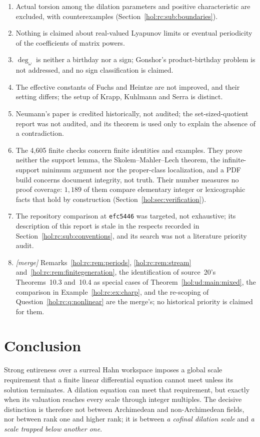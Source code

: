 \documentclass[11pt]{article}
\numberwithin{equation}{section}
\theoremstyle{definition}
\theoremstyle{remark}
\begin{document}
\begin{enumerate}[label=\textup{(V\arabic*)}]
derivation; derivations of the coefficient field are not treated
(Question~\ref{hol:rc:q:derivations}).
\item Actual torsion among the dilation parameters and positive characteristic
are excluded, with counterexamples (Section~\ref{hol:rc:sub:boundaries}).
\item Nothing is claimed about real-valued Lyapunov limits or eventual
periodicity of the coefficients of matrix powers.
\item $\deg_\omega$ is neither a birthday nor a sign; Gonshor's
product-birthday problem is not addressed, and no sign classification is
claimed.
\item The effective constants of Fuchs and Heintze are not improved, and
their setting differs; the setup of Krapp, Kuhlmann and Serra is distinct.
\item Neumann's paper is credited historically, not audited; the
set-sized-quotient report was not audited, and its theorem is used only to
explain the absence of a contradiction.
\item The 4{,}605 finite checks concern finite identities and examples. They
prove neither the support lemma, the Skolem--Mahler--Lech theorem, the
infinite-support minimum argument nor the proper-class localization, and a
PDF build concerns document integrity, not truth. Their number measures no
proof coverage: $1{,}189$ of them compare elementary integer or lexicographic
facts that hold by construction (Section~\ref{hol:sec:verification}).
\item The repository comparison at \texttt{efc5446} was targeted, not
exhaustive; its description of this report is stale in the respects recorded
in Section~\ref{hol:rc:sub:conventions}, and its search was not a literature
priority audit.
\item \emph{[merge]} Remarks~\ref{hol:rc:rem:periods},
\ref{hol:rc:rem:stream} and~\ref{hol:rc:rem:finitegeneration}, the
identification of source~20's Theorems~10.3 and~10.4 as special cases of
Theorem~\ref{hol:ud:main:mixed}, the comparison in
Example~\ref{hol:rc:ex:charp}, and the re-scoping of
Question~\ref{hol:rc:q:nonlinear} are the merge's; no historical priority is
claimed for them.
\end{enumerate}

\section{Conclusion}

Strong entireness over a surreal Hahn workspace imposes a global scale
requirement that a finite linear differential equation cannot meet unless its
solution terminates. A dilation equation can meet that requirement, but
exactly when its valuation reaches every scale through integer multiples. The
decisive distinction is therefore not between Archimedean and non-Archimedean
fields, nor between rank one and higher rank; it is between \emph{a cofinal
dilation scale} and \emph{a scale trapped below another one}.
\end{document}
